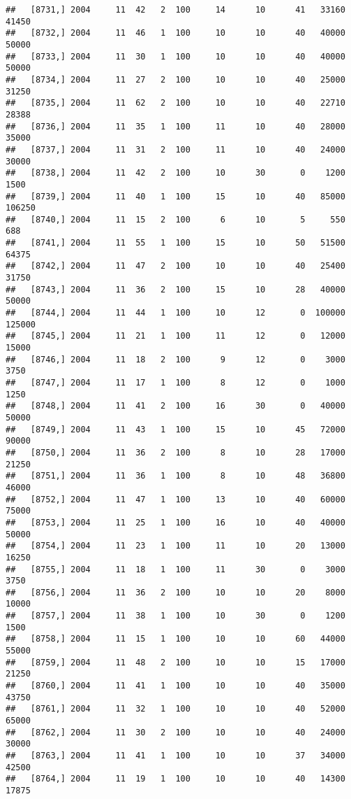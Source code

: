 \documentclass{article}\usepackage[]{graphicx}\usepackage[]{color}
\makeatletter
\newenvironment{kframe}{%
 \def\at@end@of@kframe{}%
 \ifinner\ifhmode%
  \def\at@end@of@kframe{\end{minipage}}%
  \begin{minipage}{\columnwidth}%
 \fi\fi%
 \def\FrameCommand##1{\hskip\@totalleftmargin \hskip-\fboxsep
 \colorbox{shadecolor}{##1}\hskip-\fboxsep
     \hskip-\linewidth \hskip-\@totalleftmargin \hskip\columnwidth}%
 \MakeFramed {\advance\hsize-\width
   \@totalleftmargin\z@ \linewidth\hsize
   \@setminipage}}%
 {\par\unskip\endMakeFramed%
 \at@end@of@kframe}
\newenvironment{knitrout}{}{} %
\makeatother
\begin{document}
\begin{knitrout}
\begin{kframe}
\begin{verbatim}
##   [8731,] 2004     11  42   2  100     14      10      41   33160   41450
##   [8732,] 2004     11  46   1  100     10      10      40   40000   50000
##   [8733,] 2004     11  30   1  100     10      10      40   40000   50000
##   [8734,] 2004     11  27   2  100     10      10      40   25000   31250
##   [8735,] 2004     11  62   2  100     10      10      40   22710   28388
##   [8736,] 2004     11  35   1  100     11      10      40   28000   35000
##   [8737,] 2004     11  31   2  100     11      10      40   24000   30000
##   [8738,] 2004     11  42   2  100     10      30       0    1200    1500
##   [8739,] 2004     11  40   1  100     15      10      40   85000  106250
##   [8740,] 2004     11  15   2  100      6      10       5     550     688
##   [8741,] 2004     11  55   1  100     15      10      50   51500   64375
##   [8742,] 2004     11  47   2  100     10      10      40   25400   31750
##   [8743,] 2004     11  36   2  100     15      10      28   40000   50000
##   [8744,] 2004     11  44   1  100     10      12       0  100000  125000
##   [8745,] 2004     11  21   1  100     11      12       0   12000   15000
##   [8746,] 2004     11  18   2  100      9      12       0    3000    3750
##   [8747,] 2004     11  17   1  100      8      12       0    1000    1250
##   [8748,] 2004     11  41   2  100     16      30       0   40000   50000
##   [8749,] 2004     11  43   1  100     15      10      45   72000   90000
##   [8750,] 2004     11  36   2  100      8      10      28   17000   21250
##   [8751,] 2004     11  36   1  100      8      10      48   36800   46000
##   [8752,] 2004     11  47   1  100     13      10      40   60000   75000
##   [8753,] 2004     11  25   1  100     16      10      40   40000   50000
##   [8754,] 2004     11  23   1  100     11      10      20   13000   16250
##   [8755,] 2004     11  18   1  100     11      30       0    3000    3750
##   [8756,] 2004     11  36   2  100     10      10      20    8000   10000
##   [8757,] 2004     11  38   1  100     10      30       0    1200    1500
##   [8758,] 2004     11  15   1  100     10      10      60   44000   55000
##   [8759,] 2004     11  48   2  100     10      10      15   17000   21250
##   [8760,] 2004     11  41   1  100     10      10      40   35000   43750
##   [8761,] 2004     11  32   1  100     10      10      40   52000   65000
##   [8762,] 2004     11  30   2  100     10      10      40   24000   30000
##   [8763,] 2004     11  41   1  100     10      10      37   34000   42500
##   [8764,] 2004     11  19   1  100     10      10      40   14300   17875

\end{verbatim}
\end{kframe}
\end{knitrout}
\end{document}
